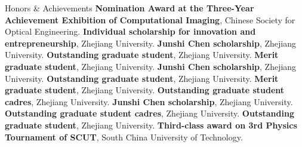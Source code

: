 \begin{rubric}{Honors \& Achievements}
\entry*[2024] \textbf{Nomination Award at the Three-Year Achievement Exhibition of Computational Imaging}, Chinese Society for Optical Engineering.
\entry*[2022] \textbf{Individual scholarship for innovation and entrepreneurship}, Zhejiang University.
\entry*[2022] \textbf{Junshi Chen scholarship}, Zhejiang University.
\entry*[2022] \textbf{Outstanding graduate student}, Zhejiang University.
\entry*[2022] \textbf{Merit graduate student}, Zhejiang University.
\entry*[2021] \textbf{Junshi Chen scholarship}, Zhejiang University.
\entry*[2021] \textbf{Outstanding graduate student}, Zhejiang University.
\entry*[2021] \textbf{Merit graduate student}, Zhejiang University.
\entry*[2021] \textbf{Outstanding graduate student cadres}, Zhejiang University.
\entry*[2020] \textbf{Junshi Chen scholarship}, Zhejiang University.
\entry*[2020] \textbf{Outstanding graduate student cadres}, Zhejiang University.
\entry*[2019] \textbf{Outstanding graduate student}, Zhejiang University.
\entry*[2015] \textbf{Third-class award on 3rd Physics Tournament of SCUT}, South China University of Technology.
\end{rubric}